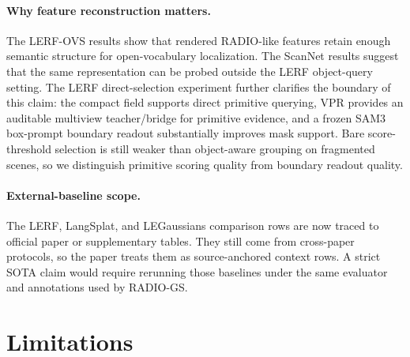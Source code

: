 \documentclass[10pt,twocolumn,letterpaper]{article}
\newcommand{\project}{RADIO-GS}
\begin{document}
\paragraph{Why feature reconstruction matters.}
The LERF-OVS results show that rendered RADIO-like features retain enough
semantic structure for open-vocabulary localization. The ScanNet results suggest
that the same representation can be probed outside the LERF object-query setting.
The LERF direct-selection experiment further clarifies the boundary of this
claim: the compact field supports direct primitive querying, VPR provides an
auditable multiview teacher/bridge for primitive evidence, and a frozen SAM3
box-prompt boundary readout substantially improves mask support. Bare
score-threshold selection is still weaker than object-aware grouping on
fragmented scenes, so we distinguish primitive scoring quality from boundary
readout quality.

\paragraph{External-baseline scope.}
The LERF, LangSplat, and LEGaussians comparison rows are now traced to official
paper or supplementary tables. They still come from cross-paper protocols, so
the paper treats them as source-anchored context rows. A strict SOTA claim would
require rerunning those baselines under the same evaluator and annotations used
by \project{}.

\section{Limitations}
\end{document}
